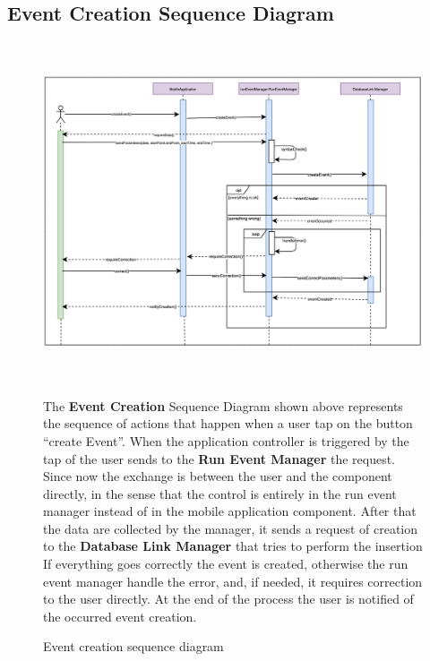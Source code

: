 \documentclass[DD.tex]{subfiles}
\begin{document}
\subsection{Event Creation Sequence Diagram}
\begin{figure}[h!]
\centering
\includegraphics[height=10.00cm,keepaspectratio]{Figures/EventCreation}
\caption{Event creation sequence diagram}

The \textbf{Event Creation} Sequence Diagram shown above represents the sequence of actions that happen when a user tap on the button “create Event”.
When the application controller is triggered by the tap of the user sends to the \textbf{Run Event Manager} the request.
Since now the exchange is between the user and the component directly, in the sense that the control is entirely in the run event manager instead of in the mobile application component.
After that the data are collected by the manager, it sends a request of creation to the \textbf{Database Link Manager }that tries to perform the insertion
If everything goes correctly the event is created, otherwise the run event manager handle the error, and, if needed, it requires correction to the user directly.
At the end of the process the user is notified of the occurred event creation.
\end{figure}

\newpage
\end{document}
